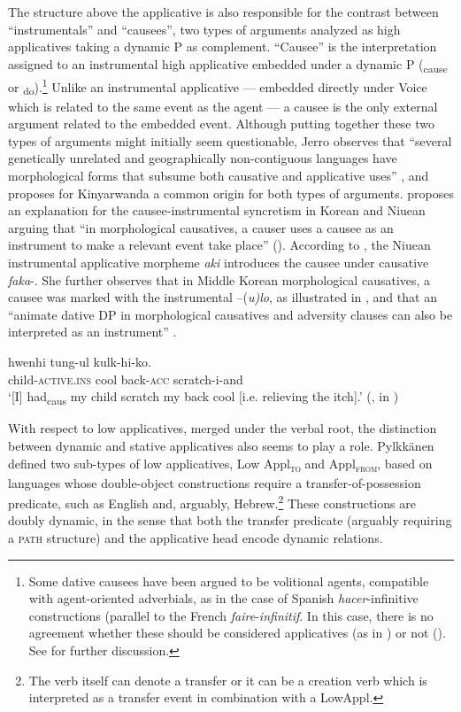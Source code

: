 \documentclass[output=paper,colorlinks,citecolor=brown,modfonts,nonflat]{langsci/langscibook}
\begin{document}
The structure above the applicative is also responsible for the contrast between “instrumentals” and “causees”, two types of arguments analyzed as high applicatives taking a dynamic {\liv}P as complement. “Causee” is the interpretation assigned to an instrumental high applicative embedded under a dynamic {\liv}P ({\liv}\textsubscript{cause}  or {\liv}\textsubscript{do}).\footnote{Some dative causees have been argued to be volitional agents, compatible with agent-oriented adverbials, as in the case of Spanish \textit{hacer}-infinitive constructions (parallel to the French \textit{faire}-\textit{infinitif}. In this case, there is no agreement whether these should be considered applicatives (as in \citealt{Torrego2011}) or not (\citealt{Kim2011high, Tubino2012}). See  for further discussion.} Unlike an instrumental applicative — embedded directly under Voice which is related to the same event as the agent — a causee is the only external argument related to the embedded event. Although putting together these two types of arguments might initially seem questionable, Jerro observes that “several genetically unrelated and geographically non-contiguous languages have morphological forms that subsume both causative and applicative uses” \citep[752]{Jerro2017}, and proposes for Kinyarwanda a common origin for both types of arguments.  \citet{Kim2011high} proposes an explanation for the causee-instrumental syncretism in Korean and Niuean arguing that “in morphological causatives, a causer uses a causee as an instrument to make a relevant event take place” (\citeyear[499]{Kim2011high}). According to \citeauthor{Kim2011high}, the Niuean instrumental applicative morpheme \textit{aki} introduces the causee under causative \textit{faka}-. She further observes that in Middle Korean morphological causatives, a causee was marked with the instrumental –(\textit{u)lo}, as illustrated in , and that an “animate dative DP in morphological causatives and adversity clauses can also be interpreted as an instrument” \citep[499]{Kim2011high}.

\ea%
    \label{ex:cuervo:5}
     {hwenhi} {tung-ul} {kulk-hi-ko}.\\
    child\textsc{-active.ins} cool back\textsc{-acc} scratch-i-and\\
    \glt ‘[I] had\textsubscript{caus} my child scratch my back cool [i.e. relieving the   itch].’  (\citealt{Park1994}, in \citealt[499]{Kim2011high})
    \z

\largerpage
With respect to low applicatives, merged under the verbal root, the distinction between dynamic and stative applicatives also seems to play a role. Pylkkänen defined two sub-types of low applicatives, Low Appl\textsc{\textsubscript{to}}\textsubscript{} and Appl\textsc{\textsubscript{from}}, based on languages whose double-object constructions require a transfer-of-possession predicate, such as English and, arguably, Hebrew.\footnote{The verb itself can denote a transfer or it can be a creation verb which is interpreted as a transfer event in combination with a LowAppl.} These constructions are doubly dynamic, in the sense that both the transfer predicate (arguably requiring a \textsc{path} structure) and the applicative head encode dynamic relations.
\end{document}
